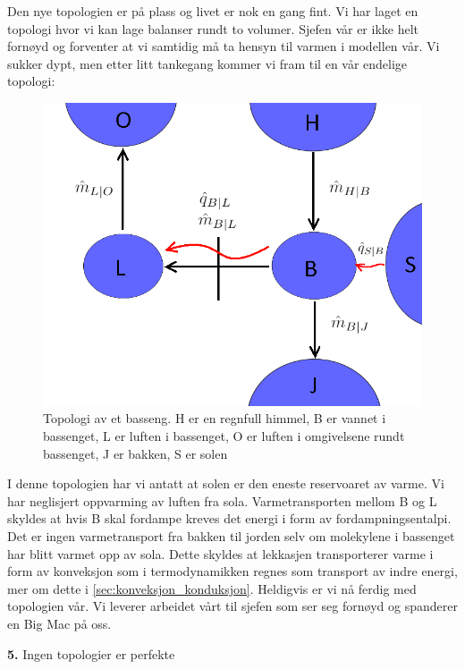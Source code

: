 Den nye topologien er på plass og livet er nok en gang fint. Vi har laget en topologi hvor vi kan lage balanser rundt to volumer. Sjefen vår er ikke helt fornøyd og forventer at vi samtidig må ta hensyn til varmen i modellen vår. Vi sukker dypt, men etter litt tankegang kommer vi fram til en vår endelige topologi:

\begin{figure}[H]
    \centering
    \includegraphics[scale=0.3]{Figures/Basseng3.png}
    \caption{Topologi av et basseng. H er en regnfull himmel, B er vannet i bassenget, L er luften i bassenget, O er luften i omgivelsene rundt bassenget, J er bakken, S er solen}
    \label{fig:my_label}
\end{figure}
I denne topologien har vi antatt at solen er den eneste reservoaret av varme. Vi har neglisjert oppvarming av luften fra sola. Varmetransporten mellom B og L skyldes at hvis B skal fordampe kreves det energi i form av fordampningsentalpi. Det er ingen varmetransport fra bakken til jorden selv om molekylene i bassenget har blitt varmet opp av sola. Dette skyldes at lekkasjen transporterer varme i form av konveksjon som i termodynamikken regnes som transport av indre energi, mer om dette i \cref{sec:konveksjon_konduksjon}. Heldigvis er vi nå ferdig med topologien vår. Vi leverer arbeidet vårt til sjefen som ser seg fornøyd og spanderer en Big Mac på oss. 

\begin{center}
    \textbf{5.} Ingen topologier er perfekte
\end{center}

